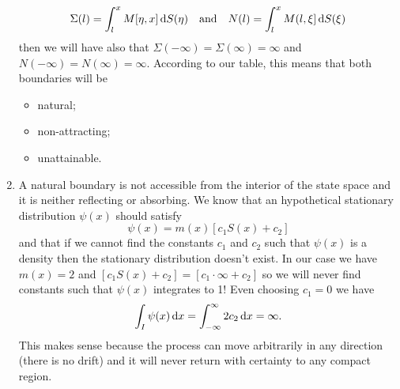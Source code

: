 \documentclass[12pt]{article}
\begin{document}
\begin{enumerate}
		\begin{equation*}
			\Sigma(l)=\int_{l}^{x}M[\eta,x]\mathop{}\!\mathrm{d} S(\eta)\quad\mathrm{and}\quad N(l)=\int_{l}^{x}M(l,\xi]\mathop{}\!\mathrm{d} S(\xi)
		\end{equation*}
		then we will have also that $\Sigma(-\infty)=\Sigma(\infty)=\infty$ and $N(-\infty)=N(\infty)=\infty$. According to our table, this means that both boundaries will be 
		\begin{itemize}
			\item natural;
			\item non-attracting;
			\item unattainable.
		\end{itemize}
		\item A natural boundary is not accessible from the interior of the state space and it is neither reflecting or absorbing. We know that an hypothetical stationary distribution $\psi(x)$ should satisfy
		\begin{equation*}
			\psi(x)=m(x)\left[c_{1}S(x)+c_{2}\right]
		\end{equation*}
		and that if we cannot find the constants $c_{1}$ and $c_{2}$ such that $\psi(x)$ is a density then the stationary distribution doesn't exist. In our case we have $m(x)=2$ and $\left[c_{1}S(x)+c_{2}\right]=\left[c_{1}\cdot\infty+c_{2}\right]$ so we will never find constants such that $\psi(x)$ integrates to 1! Even choosing $c_{1}=0$ we have
		\begin{equation*}
			\int_{I}\psi(x)\mathop{}\!\mathrm{d} x=\int_{-\infty}^{\infty}2c_{2}\mathop{}\!\mathrm{d} x=\infty.
		\end{equation*}
		This makes sense because the process can move arbitrarily in any direction (there is no drift) and it will never return with certainty to any compact region.
	\end{enumerate}
	\printbibliography
\end{document}
